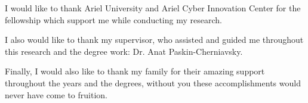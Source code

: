 \documentclass[
11pt, %
oneside, %
english, %
singlespacing, %
headsepline, %
]{MastersDoctoralThesis} %
\begin{document}








\begin{acknowledgements}
\addchaptertocentry{\acknowledgementname} %

I would like to thank Ariel University and Ariel Cyber Innovation Center for the fellowship which support me while conducting my research.

I also would like to thank my supervisor, who assisted and guided me throughout this research and the degree work: Dr. Anat Paskin-Cherniavsky. 

Finally, I would also like to thank my family for their amazing support throughout the years and the degrees, without you these accomplishments would never have come to fruition.




\end{acknowledgements}




\end{document}
